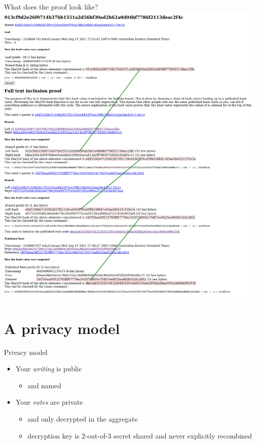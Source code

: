 \documentclass[10pt,xcolor=svgnames,169]{beamer} %
\begin{document}
	
	\begin{frame}[fragile]{What does the proof look like?}
		\includegraphics[scale=0.17]{InclusionProof.png}
	\end{frame}
	
	\section{A privacy model}
	\begin{frame}[standout]{Privacy model} 
		
		\begin{itemize}
			\item Your \emph{writing} is public
				\begin{itemize} 
					\item and named
				\end{itemize}
			\item Your \emph{votes} are private 
				\begin{itemize}
					\item and only decrypted in the aggregate
					\item decryption key is 2-out-of-3 secret shared and never explicitly recombined 
				\end{itemize}
		\end{itemize}
	\end{frame}
	
\end{document}
